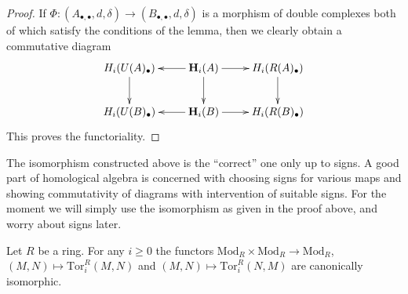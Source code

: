 \begin{proof}
\medskip\noindent
If $\Phi : (A_{\bullet, \bullet}, d, \delta)
\to (B_{\bullet, \bullet}, d, \delta)$ is a morphism
of double complexes both of which satisfy the conditions
of the lemma, then we clearly obtain a commutative
diagram
$$
\xymatrix{
H_i(U(A)_\bullet) \ar[d] &
\mathbf{H}_i(A) \ar[r] \ar[l] \ar[d] &
H_i(R(A)_\bullet) \ar[d] \cr
H_i(U(B)_\bullet) &
\mathbf{H}_i(B) \ar[r] \ar[l] &
H_i(R(B)_\bullet) \cr
}
$$
This proves the functoriality.
\end{proof}

\begin{remark}
\label{remark-signs-double-complex}
The isomorphism constructed above is the ``correct'' one only up to signs.
A good part of homological algebra is concerned with choosing signs for
various maps and showing commutativity of diagrams with intervention
of suitable signs. For the moment we will simply use the isomorphism
as given in the proof above, and worry about signs later.
\end{remark}

\begin{lemma}
\label{lemma-tor-left-right}
Let $R$ be a ring. For any $i \geq 0$ the functors
$\text{Mod}_R \times \text{Mod}_R \to \text{Mod}_R$,
$(M, N) \mapsto \text{Tor}_i^R(M, N)$ and
$(M, N) \mapsto \text{Tor}_i^R(N, M)$ are
canonically isomorphic.
\end{lemma}

